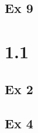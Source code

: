 \documentclass[12pt,letterpaper]{article}
\begin{document}
\subsection*{Ex 9}


\section*{1.1}


\subsection*{Ex 2}


\subsection*{Ex 4}

\end{document}
